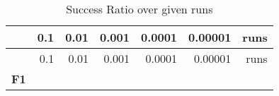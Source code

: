 \documentclass[12pt,a4paper]{article}
\begin{document}
\begin{longtable}[c]{@{}crrrrrr@{}}
\caption{Success Ratio over given runs}\tabularnewline
\toprule
\begin{minipage}[b]{0.11\columnwidth}\centering\strut
~
\strut\end{minipage} &
\begin{minipage}[b]{0.07\columnwidth}\raggedleft\strut
0.1
\strut\end{minipage} &
\begin{minipage}[b]{0.08\columnwidth}\raggedleft\strut
0.01
\strut\end{minipage} &
\begin{minipage}[b]{0.09\columnwidth}\raggedleft\strut
0.001
\strut\end{minipage} &
\begin{minipage}[b]{0.10\columnwidth}\raggedleft\strut
0.0001
\strut\end{minipage} &
\begin{minipage}[b]{0.11\columnwidth}\raggedleft\strut
0.00001
\strut\end{minipage} &
\begin{minipage}[b]{0.07\columnwidth}\raggedleft\strut
runs
\strut\end{minipage}\tabularnewline
\midrule
\endfirsthead
\toprule
\begin{minipage}[b]{0.11\columnwidth}\centering\strut
~
\strut\end{minipage} &
\begin{minipage}[b]{0.07\columnwidth}\raggedleft\strut
0.1
\strut\end{minipage} &
\begin{minipage}[b]{0.08\columnwidth}\raggedleft\strut
0.01
\strut\end{minipage} &
\begin{minipage}[b]{0.09\columnwidth}\raggedleft\strut
0.001
\strut\end{minipage} &
\begin{minipage}[b]{0.10\columnwidth}\raggedleft\strut
0.0001
\strut\end{minipage} &
\begin{minipage}[b]{0.11\columnwidth}\raggedleft\strut
0.00001
\strut\end{minipage} &
\begin{minipage}[b]{0.07\columnwidth}\raggedleft\strut
runs
\strut\end{minipage}\tabularnewline
\midrule
\endhead
\begin{minipage}[t]{0.11\columnwidth}\centering\strut
\textbf{F1}

\end{minipage}
\end{longtable}
\end{document}
